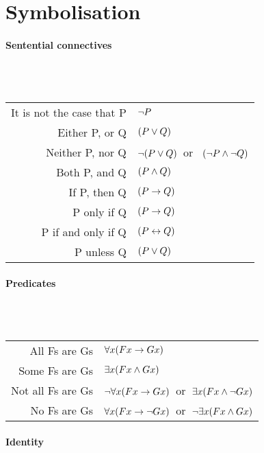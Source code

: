 \section*{Symbolisation}
\label{app.symbolization}

\paragraph{Sentential connectives}~\\

\hspace{1cm}~\begin{tabular}{rl} \toprule
It is not the case that P & $\neg P$\\
Either P, or Q & $(P \vee Q)$\\
Neither P, nor Q & $\neg(P \vee Q)$\ or \ $(\neg P \wedge \neg Q)$\\
Both P, and Q & $(P \wedge Q)$\\
If P, then Q & $(P \rightarrow Q)$\\
P only if Q & $(P \rightarrow Q)$\\
P if and only if Q & $(P \leftrightarrow Q)$\\
P unless Q & $(P \vee Q)$\\
\bottomrule\end{tabular}

\paragraph{Predicates}~\\

\hspace{1cm}~\begin{tabular}{rl} \toprule
All Fs are Gs & $\forall x(Fx \rightarrow Gx)$\\
Some Fs are Gs & $\exists x(Fx \wedge Gx)$\\
Not all Fs are Gs & $\neg\forall x(Fx \rightarrow Gx)$\ or\ $\exists x(Fx \wedge \neg Gx)$\\
No Fs are Gs & $\forall x(Fx \rightarrow\neg Gx)$\ or\ $\neg\exists x(Fx \wedge Gx)$\\
\bottomrule\end{tabular}

\newpage\paragraph{Identity}~\\

